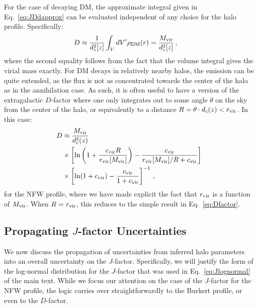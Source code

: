 For the case of decaying DM, the approximate integral given in Eq.~\ref{eq:JDdapprox} can be evaluated independent of any choice for the halo profile.   Specifically:
\begin{equation}\begin{aligned}
D &\approx \frac{1}{d_c^2[z]} \int_V dV' \rho_{\rm DM}(r) = \frac{M_{\rm vir}}{d_c^2[z]}\,,
\label{eq:Dfactor}
\end{aligned}\end{equation}
where the second equality follows from the fact that the volume integral gives the virial mass exactly.
For DM decays in relatively nearby halos, the emission can be quite extended, as the flux is not as concentrated towards the center of the halo as in the annihilation case.  As such, it is often useful to have a version of the extragalactic $D$-factor where one only integrates out to some angle $\theta$ on the sky from the center of the halo, or equivalently to a distance $R = \theta \cdot d_c(z) < r_{\rm vir}$. In this case:\begin{align}
D &\approx \frac{M_{\rm vir}}{d_c^2(z)} \\
&\times \left[ \ln \left( 1 + \frac{c_{\rm vir} R}{r_{\rm vir}[M_{\rm vir}]} \right) - \frac{c_{\rm vir}}{r_{\rm vir}[M_{\rm vir}]/R + c_{\rm vir}} \right] \notag \\
&\times \left[ \ln (1 + c_{\rm vir}) - \frac{c_{\rm vir}}{1+c_{\rm vir}} \right]^{-1}\,, \notag
\end{align}
for the NFW profile, where we have made explicit the fact that $r_{\rm vir}$ is a function of $M_{\rm vir}$.  When $R=r_{\rm vir}$, this reduces to the simple result in Eq.~\ref{eq:Dfactor}.

\subsection{Propagating $J$-factor Uncertainties}
\label{app:Juncertainties}

We now discuss the propagation of uncertainties from inferred halo parameters into an overall uncertainty on the $J$-factor.  Specifically, we will justify the form of the log-normal distribution for the $J$-factor that was used in Eq.~\ref{eq:Jlognormal} of the main text.  While we focus our attention on the case of the $J$-factor for the NFW profile, the logic carries over straightforwardly to the Burkert profile, or even to the $D$-factor.

